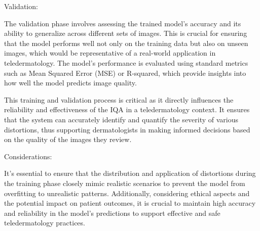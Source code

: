 \noindent
Validation:\par
The validation phase involves assessing the trained model's accuracy and its ability to generalize across different sets of images. This is crucial for ensuring that the model performs well not only on the training data but also on unseen images, which would be representative of a real-world application in teledermatology. The model's performance is evaluated using standard metrics such as Mean Squared Error (MSE) or R-squared, which provide insights into how well the model predicts image quality.\par
\noindent
This training and validation process is critical as it directly influences the reliability and effectiveness of the IQA in a teledermatology context. It ensures that the system can accurately identify and quantify the severity of various distortions, thus supporting dermatologists in making informed decisions based on the quality of the images they review.\par
\noindent
Considerations:\par
It's essential to ensure that the distribution and application of distortions during the training phase closely mimic realistic scenarios to prevent the model from overfitting to unrealistic patterns. Additionally, considering ethical aspects and the potential impact on patient outcomes, it is crucial to maintain high accuracy and reliability in the model's predictions to support effective and safe teledermatology practices.\par